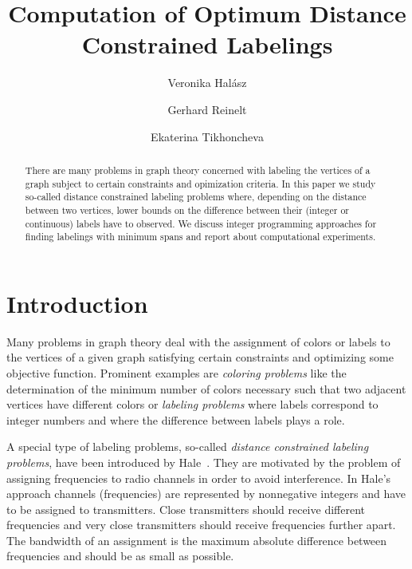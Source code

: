 \documentclass[smallextended]{svjour3}
\begin{document}
\title{Computation of Optimum Distance Constrained Labelings}
\author{Veronika Hal\'asz \and Gerhard Reinelt \and Ekaterina Tikhoncheva}

\date{\datum}

\maketitle

\begin{abstract}
There are many problems in graph theory concerned with labeling the
vertices of a graph subject to certain constraints and opimization criteria. In this
paper we study so-called distance constrained labeling problems where, depending on
the distance between two vertices, lower bounds on the difference
between their (integer or continuous) labels have to observed. We discuss integer programming
approaches for finding labelings with minimum spans and report about computational
experiments.
\end{abstract}


%
%
%
\section{Introduction}

Many problems in graph theory deal with the assignment of colors or labels to the vertices
of a given graph satisfying certain constraints and optimizing some objective function.
Prominent examples are \emph{coloring problems} like the determination of the minimum
number of colors necessary such that two adjacent vertices have different colors
or \emph{labeling problems} where labels correspond to integer numbers and where
the difference between labels plays a role.

A special type of labeling problems, so-called
\emph{distance constrained labeling problems}, have been introduced by Hale~\cite{Hal80}.
They are motivated by the problem of assigning frequencies to radio channels in order
to avoid interference. In Hale's approach channels (frequencies) are
represented by nonnegative integers and have to be assigned to transmitters.
Close transmitters should receive different frequencies and very close
transmitters should receive frequencies further apart. The bandwidth of an assignment
is the maximum absolute difference between frequencies and should be as small
as possible.
\end{document}
